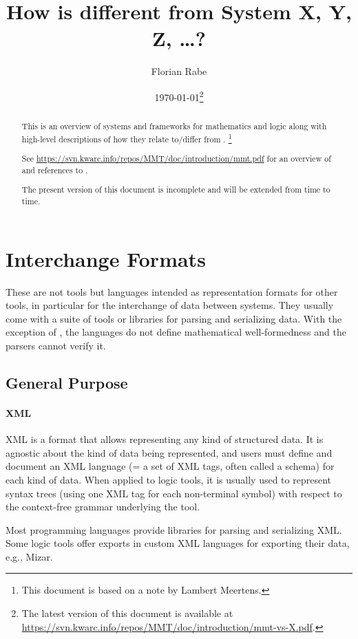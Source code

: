 \documentclass[12pt]{article}
\newcommand{\system}[2][]{\paragraph{#2}#2 \ifnonempty[\cite{#2}]{#1}{\cite{#1}}}
\begin{document}
\title{How is \mmt different from System X, Y, Z, \ldots ?}
\author{Florian Rabe}
\date{\today\footnote{The latest version of this document is available at \url{https://svn.kwarc.info/repos/MMT/doc/introduction/mmt-vs-X.pdf}.}}
\maketitle

\begin{abstract}
This is an overview of systems and frameworks for mathematics and logic along with high-level descriptions of how they relate to/differ from \mmt.
\footnote{This document is based on a note by Lambert Meertens.}

See \url{https://svn.kwarc.info/repos/MMT/doc/introduction/mmt.pdf} for an overview of and references to \mmt.

The present version of this document is incomplete and will be extended from time to time.
\end{abstract}

\section{Interchange Formats}

These are not tools but languages intended as representation formats for other tools, in particular for the interchange of data between systems.
They usually come with a suite of tools or libraries for parsing and serializing data.
With the exception of \mmt, the languages do not define mathematical well-formedness and the parsers cannot verify it.

\subsection{General Purpose}

\system{XML}
is a format that allows representing any kind of structured data.
It is agnostic about the kind of data being represented, and users must define and document an XML language (= a set of XML tags, often called a schema) for each kind of data.
When applied to logic tools, it is usually used to represent syntax trees (using one XML tag for each non-terminal symbol) with respect to the context-free grammar underlying the tool.

Most programming languages provide libraries for parsing and serializing XML.
Some logic tools offer exports in custom XML languages for exporting their data, e.g., Mizar.
\end{document}

